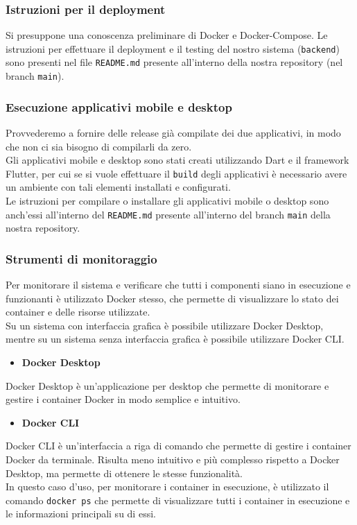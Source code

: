 \documentclass{article}
\begin{document}
\clearpage

\subsubsection{Istruzioni per il deployment}
Si presuppone una conoscenza preliminare di Docker e Docker-Compose.
Le istruzioni per effettuare il deployment e il testing del nostro sistema (\texttt{backend}) sono presenti nel file \texttt{README.md} presente all'interno della nostra repository (nel branch \texttt{main}).


\subsubsection{Esecuzione applicativi mobile e desktop}
Provvederemo a fornire delle release già compilate dei due applicativi, in modo che non ci sia bisogno di compilarli da zero.\\
Gli applicativi mobile e desktop sono stati creati utilizzando Dart e il framework Flutter, per cui se si vuole effettuare il \texttt{build} degli applicativi è necessario avere un ambiente con tali elementi installati e configurati.
\\
Le istruzioni per compilare o installare gli applicativi mobile o desktop sono anch'essi all'interno del \texttt{README.md} presente all'interno del branch \texttt{main} della nostra repository. 

\subsubsection{Strumenti di monitoraggio}
Per monitorare il sistema e verificare che tutti i componenti siano in esecuzione e funzionanti è utilizzato Docker stesso, che permette di visualizzare lo stato dei container e delle risorse utilizzate.\\
Su un sistema con interfaccia grafica è possibile utilizzare Docker Desktop, mentre su un sistema senza interfaccia grafica è possibile utilizzare Docker CLI.
\begin{itemize}
    \item \textbf{Docker Desktop}
\end{itemize}
Docker Desktop è un'applicazione per desktop che permette di monitorare e gestire i container Docker in modo semplice e intuitivo.
\begin{itemize}
    \item \textbf{Docker CLI}
\end{itemize}
Docker CLI è un'interfaccia a riga di comando che permette di gestire i container Docker da terminale. Risulta meno intuitivo e più complesso rispetto a Docker Desktop, ma permette di ottenere le stesse funzionalità.\\
In questo caso d'uso, per monitorare i container in esecuzione, è utilizzato il comando \texttt{docker ps} che permette di visualizzare tutti i container in esecuzione e le informazioni principali su di essi.
\end{document}
